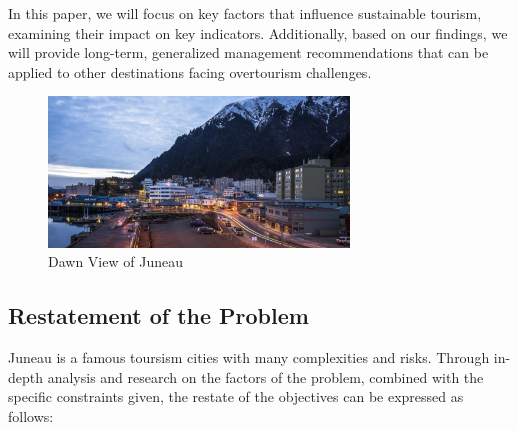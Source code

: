 \documentclass[UTF8]{mcmthesis}
\begin{document}
            In this paper, we will focus on key factors that influence sustainable tourism, examining their impact on key indicators. Additionally, based on our findings, we will provide long-term, generalized management recommendations that can be applied to other destinations facing overtourism challenges.

            \begin{figure}[htbp]
                \centering
                \includegraphics[width=8cm]{figure1.png}
                \caption{Dawn View of Juneau}
            \end{figure}
        
        \subsection{Restatement of the Problem}
        \hspace*{2em}Juneau is a famous toursism cities with many complexities and risks. Through in-depth analysis and research on the factors of the problem, combined with the specific constraints given, the restate of the objectives can be expressed as follows:
\end{document}

